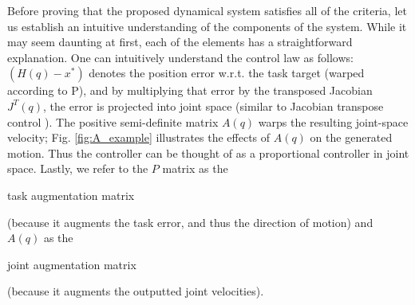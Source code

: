 \documentclass[letterpaper, 10 pt, conference,fleqn]{ieeeconf}
\begin{document}
Before proving that the proposed dynamical system satisfies all of the criteria, let us establish an intuitive understanding of the components of the system. While it may seem daunting at first, each of the elements has a straightforward explanation. One can intuitively understand the control law as follows: $(H(q) - x^*)$ denotes the position error w.r.t. the task target (warped according to P), and by multiplying that error by the transposed Jacobian $J^T(q)$, the error is projected into joint space (similar to Jacobian transpose control \cite{wolovich1984computational,sciavicco1988solution}). The positive semi-definite matrix $A(q)$ warps the resulting joint-space velocity; Fig. \ref{fig:A_example} illustrates the effects of  $A(q)$ on the generated motion. Thus the controller can be thought of as a proportional controller in joint space. Lastly, we refer to the $P$ matrix as the \begin{bf} task augmentation matrix \end{bf}(because it augments the task error, and thus the direction of motion) and $A(q)$ as the \begin{bf} joint augmentation matrix \end{bf} (because it augments the outputted joint velocities).
\end{document}
